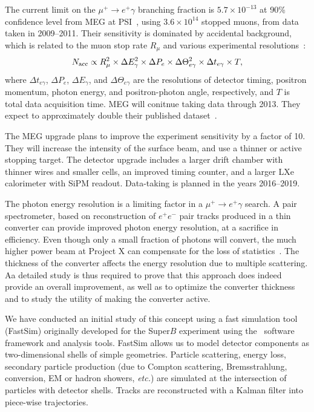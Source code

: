 
The current limit on the $\mu^+\to e^+ \gamma$ branching fraction is 
$5.7\times 10^{-13}$ at 90\% confidence level from MEG at 
PSI~\cite{Adam:2013mnn}, using 
$3.6\times 10^{14}$ stopped muons, from data taken in 2009--2011. 
Their sensitivity is dominated by 
accidental background, which is related to the muon stop rate
$R_\mu$ and various experimental resolutions~\cite{Baldini:2013ke}:
\begin{equation}
N_{\rm acc} \propto R_{\mu}^2 \times \Delta E_\gamma^2 \times \Delta P_e 
\times \Delta \Theta^2_{e\gamma} \times \Delta t_{e\gamma} \times T ,
\end{equation}
where $\Delta t_{e\gamma}$, $\Delta P_e$, 
$\Delta E_\gamma$, and $\Delta\Theta_{e\gamma}$ are the resolutions of 
detector timing, positron momentum, photon energy, and positron-photon angle,
respectively, and $T$ is total data acquisition time. MEG will conitnue 
taking data through 2013. They expect to
approximately double their published dataset~\cite{GLimArgonne2013}.

The MEG upgrade plans to improve the experiment sensitivity by a factor of 10. 
They will increase the intensity of the surface beam, and use a thinner or
active stopping target. The detector upgrade includes a larger drift chamber with
thinner wires and smaller cells, an improved timing counter, and a larger LXe
calorimeter with SiPM readout. Data-taking is planned in the years 2016--2019.

The photon energy
resolution is a limiting factor in a $\mu^+\to e^+ \gamma$ search.  A pair spectrometer, based on reconstruction of $e^+e^-$ pair tracks produced in a
thin converter can provide improved photon energy resolution, at a sacrifice in efficiency. Even though only a small fraction of photons will convert,
the much higher power beam at Project X can
compensate for the loss of statistics~\cite{Fritz:2012aaa}. The thickness of the converter affects the energy 
resolution due to multiple scattering. Aa detailed study is thus required to prove that this approach does indeed provide an overall
improvement, as well as to optimize the converter thickness and to study the utility of making the converter active.

We have conducted an initial study of this concept using a fast simulation tool
(FastSim) originally developed for the Super$B$ experiment using the  \babar\ software
framework and analysis tools. FastSim allows us to model detector components
as two-dimensional shells of simple geometries. Particle scattering, energy
loss, secondary particle production (due to Compton scattering, Bremsstrahlung,
conversion, EM or hadron showers, {\it etc.}) are simulated at the intersection
of particles with detector shells. Tracks are reconstructed with a Kalman filter
into piece-wise trajectories. 

